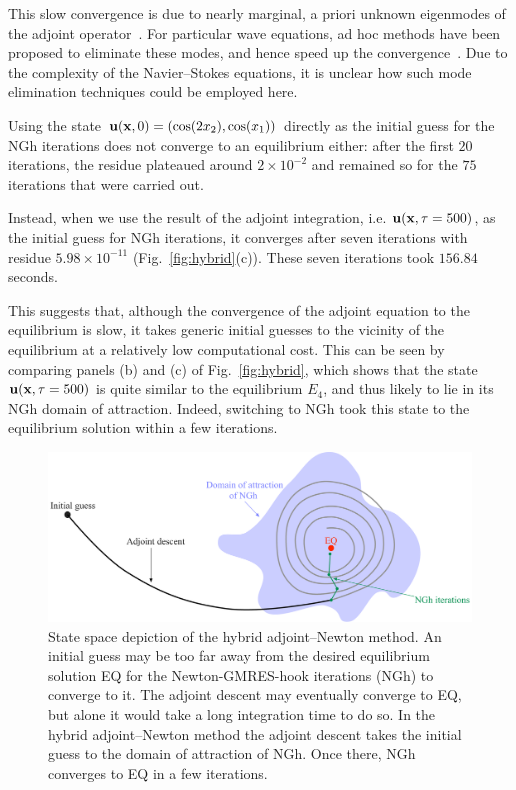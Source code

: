 \documentclass{article}
\begin{document}
This slow convergence is due to nearly marginal, a priori unknown eigenmodes of the adjoint
operator~\citep{LY07}. For particular wave equations, ad hoc
methods have been proposed to eliminate these modes, and hence speed up the
convergence~\citep{yang07}.
Due to the complexity of the Navier--Stokes equations, it is unclear how such mode elimination
techniques could be employed here.

Using the state $\mathbf u(\mathbf x,0)=(\cos(2x_2),\cos(x_1))$ directly as the initial
guess for the NGh iterations does not converge to an equilibrium either: after the first $20$
iterations, the residue plateaued around $2\times 10^{-2}$ and remained so for the $75$ iterations
that were carried out.

Instead, when we use the result of the adjoint integration, i.e. $\mathbf u(\mathbf x,\tau=500)$, as the
initial guess for NGh iterations, it converges after seven iterations with residue
$5.98\times 10^{-11}$ (Fig.~\ref{fig:hybrid}(c)). These seven iterations took $156.84$ seconds.

This suggests that, although the convergence of the adjoint equation to the equilibrium is slow, it
takes generic initial guesses to the vicinity of the equilibrium at a relatively low computational
cost. This can be seen by comparing panels (b) and (c) of Fig.~\eqref{fig:hybrid}, which
shows that the state $\mathbf u(\mathbf x,\tau=500)$ is quite similar to the equilibrium $E_4$,
and thus likely to lie in its NGh domain of attraction. Indeed, switching to
NGh took this state to the equilibrium solution within a few iterations.

\begin{figure}
\centering
\includegraphics[width=\textwidth]{hybrid_schem}
\caption{
State space depiction of the hybrid adjoint--Newton method. An initial
guess may be too far away from the desired equilibrium solution EQ for
the Newton-GMRES-hook iterations (NGh) to converge to it. The adjoint
descent may eventually converge to EQ, but alone it would take a long
integration time to do so. In the hybrid adjoint--Newton method the
adjoint descent takes the initial guess to the domain of attraction of
NGh. Once there, NGh  converges to EQ in a few iterations.
}
\label{fig:hybrid_schem}
\end{figure}
\end{document}
